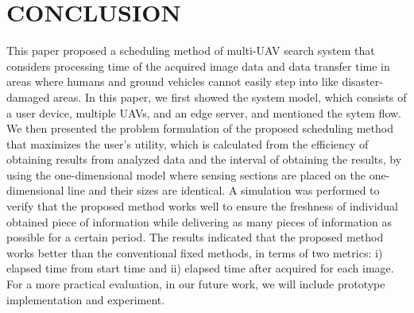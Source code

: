 \documentclass[journal]{IEEEtran}
\begin{document}
\section{CONCLUSION}
This paper proposed a scheduling method of multi-UAV search system that considers processing time of the acquired image data and data transfer time in areas where humans and ground vehicles cannot easily step into like disaster-damaged areas.
In this paper, we first showed the system model, which consists of a user device, multiple UAVs, and an edge server, and mentioned the sytem flow. 
We then presented the problem formulation of the proposed scheduling method that maximizes the user’s utility, which is calculated from the efficiency of obtaining results from analyzed data and the interval of obtaining the results, by using the one-dimensional model where sensing sections are placed on the one-dimensional line and their sizes are identical.
A simulation was performed to verify that the proposed method works well to ensure the freshness of individual obtained piece of information while delivering as many pieces of information as possible for a certain period.
The results indicated that the proposed method works better than the conventional fixed methods, in terms of two metrics: i) elapsed time from start time and ii) elapsed time after acquired for each image.
For a more practical evaluation, in our future work, we will include prototype implementation and experiment.



%
\end{document}
